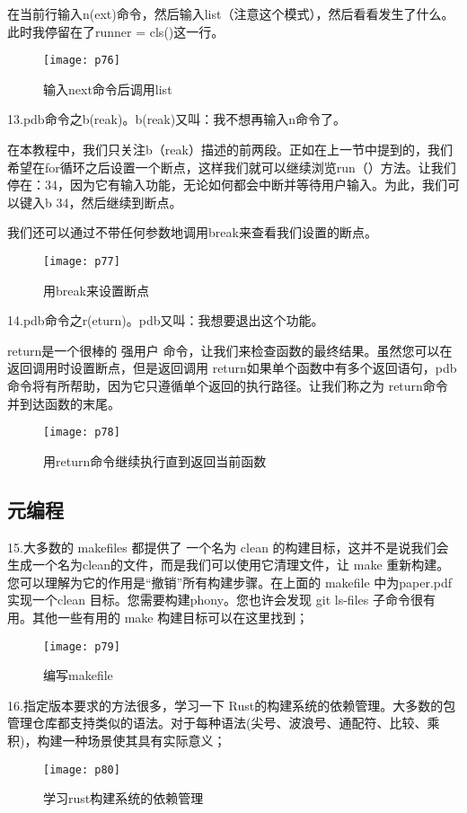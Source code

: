 \documentclass[a4paper ,12pt]{article}
\begin{document}
	在当前行输入n(ext)命令，然后输入list（注意这个模式），然后看看发生了什么。
	此时我停留在了runner = cls()这一行。
	\begin{figure}[h]
		\centering
		\texttt{[image: p76]}
		\caption{输入next命令后调用list}
	\end{figure}
	
	13.pdb命令之b(reak)。b(reak)又叫：我不想再输入n命令了。
	
	在本教程中，我们只关注b（reak）描述的前两段。正如在上一节中提到的，我们希望在for循环之后设置一个断点，这样我们就可以继续浏览run（）方法。让我们停在：34，因为它有输入功能，无论如何都会中断并等待用户输入。为此，我们可以键入b 34，然后继续到断点。
	
	我们还可以通过不带任何参数地调用break来查看我们设置的断点。
	\begin{figure}[h]
		\centering
		\texttt{[image: p77]}
		\caption{用break来设置断点}
	\end{figure}
	
	14.pdb命令之r(eturn)。pdb又叫：我想要退出这个功能。
	
	 return是一个很棒的 强用户 命令，让我们来检查函数的最终结果。虽然您可以在返回调用时设置断点，但是返回调用 return如果单个函数中有多个返回语句，pdb命令将有所帮助，因为它只遵循单个返回的执行路径。让我们称之为 return命令并到达函数的末尾。
	 \begin{figure}[h]
	 	\centering
	 	\texttt{[image: p78]}
	 	\caption{用return命令继续执行直到返回当前函数}
	 \end{figure}
	 
	 \subsection{元编程}
	 15.大多数的 makefiles 都提供了 一个名为 clean 的构建目标，这并不是说我们会生成一个名为clean的文件，而是我们可以使用它清理文件，让 make 重新构建。您可以理解为它的作用是“撤销”所有构建步骤。在上面的 makefile 中为paper.pdf实现一个clean 目标。您需要构建phony。您也许会发现 git ls-files 子命令很有用。其他一些有用的 make 构建目标可以在这里找到；
	 \begin{figure}[h]
	 	\centering
	 	\texttt{[image: p79]}
	 	\caption{编写makefile}
	 \end{figure}
	
	16.指定版本要求的方法很多，学习一下 Rust的构建系统的依赖管理。大多数的包管理仓库都支持类似的语法。对于每种语法(尖号、波浪号、通配符、比较、乘积)，构建一种场景使其具有实际意义；
	\begin{figure}[h]
		\centering
		\texttt{[image: p80]}
		\caption{学习rust构建系统的依赖管理}
	\end{figure}
	
\end{document}
